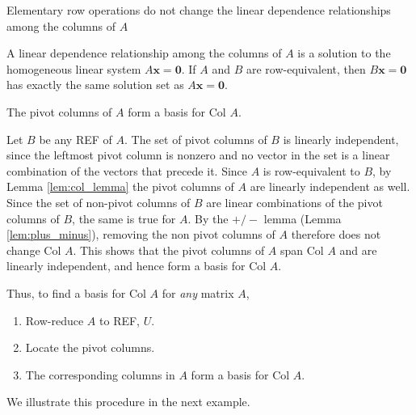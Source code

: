 \documentclass[12pt,letterpaper,reqno]{article}
\numberwithin{equation}{section}
\newcommand{\bx}{\mathbf{x}}
\newcommand{\Col}{\text{Col }}
\begin{document}
\begin{lem}\label{lem:col_lemma}
Elementary row operations do not change the linear dependence relationships among the columns of $A$
\end{lem}

\begin{pf}
A linear dependence relationship among the columns of $A$ is a solution to the homogeneous linear system $A\bx=\mathbf{0}$. If $A$ and $B$ are row-equivalent, then $B\bx=\mathbf{0}$ has exactly the same solution set as $A\bx=\mathbf{0}$.
\end{pf}

\begin{thm}[Basis for $\Col A$]\label{thm:pivot_columns_form_basis_col_a}
	The pivot columns of $A$ form a basis for $\Col A$.
\end{thm}

\begin{pf}
Let $B$ be any REF of $A$. The set of pivot columns of $B$ is linearly independent, since the leftmost pivot column is nonzero and no vector in the set is a linear combination of the vectors that precede it. Since $A$ is row-equivalent to $B$, by Lemma \ref{lem:col_lemma} the pivot columns of $A$ are linearly independent as well. Since the set of non-pivot columns of $B$ are linear combinations of the pivot columns of $B$, the same is true for $A$. By the $+/-$ lemma (Lemma \ref{lem:plus_minus}), removing the non pivot columns of $A$ therefore does not change $\Col A$. This shows that the pivot columns of $A$ span $\Col A$ and are linearly independent, and hence form a basis for $\Col A$.
\end{pf}

Thus, to find a basis for $\Col A$ for \emph{any} matrix $A$,
\begin{enumerate}
	\item Row-reduce $A$ to REF, $U$. 
	\item Locate the pivot columns.
	\item The corresponding columns in $A$ form a basis for $\Col A$.
\end{enumerate}
We illustrate this procedure in the next example.
\end{document}
